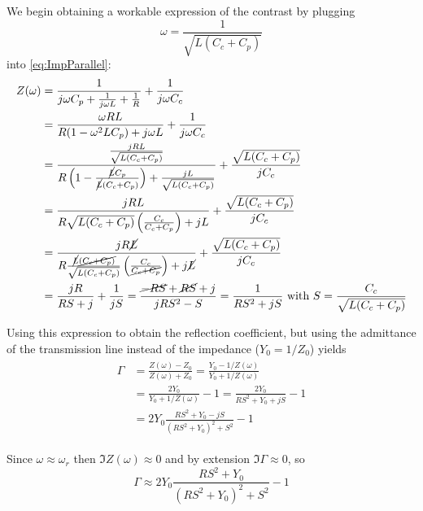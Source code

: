 \documentclass[../main.tex]{subfiles}
\begin{document}
We begin obtaining a workable expression of the contrast
by plugging \[\omega = \frac{1}{\sqrt{L(C_{c} + C_{p})}}\] into
\ref{eq:ImpParallel}:
\begin{align}
\label{eq:ImpParallelResonant}
\begin{split}
    Z(\omega) &= \frac{1}{j \omega C_{p} + \frac{1}{j \omega L} + \frac{1}{R}}
        + \frac{1}{j \omega C_{c}}\\
      &= \frac{  \omega R L}{R(1 - \omega^2 L C_{p}) + j \omega L}
        + \frac{1}{j \omega C_{c}}\\
      &= \frac{\frac{j R L}{\sqrt{L (C_{c} + C_{p})}}}{
          R\left(1 - \frac{\cancel{L} C_{p}}{\cancel{L}(C_{c} + C_{p})}\right)
            + \frac{j L}{\sqrt{L (C_{c} + C_{p})}}
            } + \frac{\sqrt{L (C_{c} + C_{p})}}{j C_{c}}\\
      &= \frac{j R L}{R\sqrt{L (C_{c} + C_{p})}
          \left(\frac{C_{c}}{C_{c} + C_{p}}\right) + j L}
          + \frac{\sqrt{L (C_{c} + C_{p})}}{j C_{c}}\\
      &= \frac{j R \cancel{L}}{R\frac{\cancel{L} \cancel{(C_{c} + C_{p})}}{
          \sqrt{L (C_{c} + C_{p})}}
          \left(\frac{C_{c}}{\cancel{C_{c} + C_{p}}}\right) + j \cancel{L}}
          + \frac{\sqrt{L (C_{c} + C_{p})}}{j C_{c}}\\
      &= \frac{j R}{RS + j} + \frac{1}{jS}
       = \frac{\cancel{-RS} + \cancel{RS} + j}{jRS^2 -S}
       = \frac{1}{RS^2 + jS}
       \text{ with } S = \frac{C_{c}}{\sqrt{L(C_{c} + C_{p})}}
\end{split}
\end{align}

Using this expression to obtain the reflection coefficient,
but using the admittance of the transmission line instead of the impedance
(\(Y_{0} = 1/Z_{0}\)) yields
\begin{align*}
\begin{split}
    \Gamma &= \frac{Z(\omega) - Z_{0}}{Z(\omega) + Z_{0}}
            = \frac{Y_{0} - 1/Z(\omega)}{Y_{0} + 1/Z(\omega)}\\
           &= \frac{2Y_{0}}{Y_{0} + 1/Z(\omega)} - 1 = \frac{2 Y_{0}}{RS^2 + Y_{0} + jS} - 1\\
           &= 2 Y_{0}\frac{RS^2 + Y_{0} - jS}{(RS^2 + Y_{0})^2 + S^2} - 1
\end{split}
\end{align*}

Since \(\omega \approx \omega_{r}\) then
\(\Im Z(\omega) \approx 0\) and by extension \(\Im \Gamma \approx 0\), so
\begin{equation*}
    \Gamma \approx 2 Y_{0}\frac{RS^2 + Y_{0}}{(RS^2 + Y_{0})^2 + S^2} - 1
\end{equation*}
\end{document}
